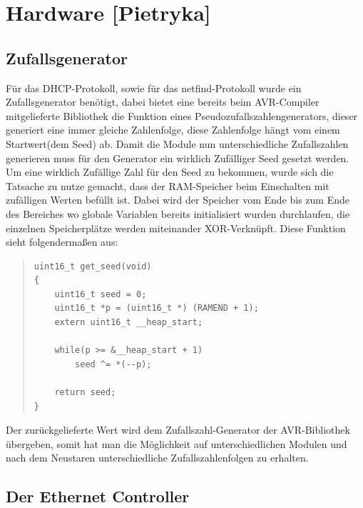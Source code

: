 \documentclass[a4paper,14pt,headsepline]{scrartcl}
\begin{document}
\newpage

\section{Hardware [Pietryka]}
\subsection{Zufallsgenerator}
Für das DHCP-Protokoll, sowie für das netfind-Protokoll wurde ein Zufallsgenerator benötigt, dabei bietet eine bereits beim AVR-Compiler mitgelieferte Bibliothek die Funktion eines Pseudozufallszahlengenerators, dieser generiert eine immer gleiche Zahlenfolge, diese Zahlenfolge hängt vom einem Startwert(dem Seed) ab. Damit die Module nun unterschiedliche Zufallszahlen generieren muss für den Generator ein wirklich Zufälliger Seed gesetzt werden. Um eine wirklich Zufällige Zahl für den Seed zu bekommen, wurde sich die Tatsache zu nutze gemacht, dass der RAM-Speicher beim Einschalten mit zufälligen Werten befüllt ist. Dabei wird der Speicher vom Ende bis zum Ende des Bereiches wo globale Variablen bereits initialisiert wurden durchlaufen, die einzelnen Speicherplätze werden miteinander XOR-Verknüpft. Diese Funktion sieht folgendermaßen aus:
\begin{quote}
\begin{verbatim}
uint16_t get_seed(void)
{
    uint16_t seed = 0;
    uint16_t *p = (uint16_t *) (RAMEND + 1);
    extern uint16_t __heap_start;

    while(p >= &__heap_start + 1)
        seed ^= *(--p);

    return seed;
}
\end{verbatim}
\end{quote}
Der zurückgelieferte Wert wird dem Zufallszahl-Generator der AVR-Bibliothek übergeben, somit hat man die Möglichkeit auf unterschiedlichen Modulen und nach dem Neustaren unterschiedliche Zufallszahlenfolgen zu erhalten.

\subsection{Der Ethernet Controller}
\end{document}
